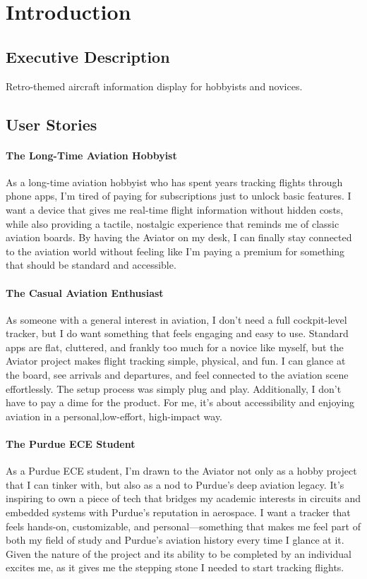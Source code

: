 \clearpage
\section{Introduction}
\subsection{Executive Description}

Retro-themed aircraft information display for hobbyists and novices.

\subsection{User Stories}

\paragraph{The Long-Time Aviation Hobbyist\newline}
As a long-time aviation hobbyist who has spent years tracking flights through phone apps, I'm tired of paying for subscriptions just to unlock basic features.
I want a device that gives me real-time flight information without hidden costs, while also providing a tactile, nostalgic experience that reminds me of classic aviation boards.
By having the Aviator on my desk, I can finally stay connected to the aviation world without feeling like I'm paying a premium for something that should be standard and accessible.

\paragraph{The Casual Aviation Enthusiast\newline}
As someone with a general interest in aviation, I don't need a full cockpit-level tracker, but I do want something that feels engaging and easy to use.
Standard apps are flat, cluttered, and frankly too much for a novice like myself, but the Aviator project makes flight tracking simple, physical, and fun.
I can glance at the board, see arrivals and departures, and feel connected to the aviation scene effortlessly. The setup process was simply plug and play.
Additionally, I don't have to pay a dime for the product. For me, it's about accessibility and enjoying aviation in a personal,low-effort, high-impact way.

\paragraph{The Purdue ECE Student\newline}
As a Purdue ECE student, I'm drawn to the Aviator not only as a hobby project that I can tinker with, but also as a nod to Purdue's deep aviation legacy.
It's inspiring to own a piece of tech that bridges my academic interests in circuits and embedded systems with Purdue's reputation in aerospace.
I want a tracker that feels hands-on, customizable, and personal—something that makes me feel part of both my field of study and Purdue's aviation history every time I glance at it.
Given the nature of the project and its ability to be completed by an individual excites me, as it gives me the stepping stone I needed to start tracking flights.
